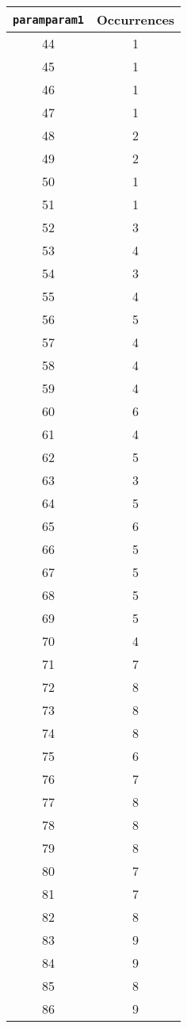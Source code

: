 \documentclass[letterpaper, 12pt]{article}
\begin{document}
\begin{longtable}{|c|c|}
\hline
\textbf{\texttt{paramparam1}} & \textbf{Occurrences} \\
\hline
44 & 1 \\
\hline
45 & 1 \\
\hline
46 & 1 \\
\hline
47 & 1 \\
\hline
48 & 2 \\
\hline
49 & 2 \\
\hline
50 & 1 \\
\hline
51 & 1 \\
\hline
52 & 3 \\
\hline
53 & 4 \\
\hline
54 & 3 \\
\hline
55 & 4 \\
\hline
56 & 5 \\
\hline
57 & 4 \\
\hline
58 & 4 \\
\hline
59 & 4 \\
\hline
60 & 6 \\
\hline
61 & 4 \\
\hline
62 & 5 \\
\hline
63 & 3 \\
\hline
64 & 5 \\
\hline
65 & 6 \\
\hline
66 & 5 \\
\hline
67 & 5 \\
\hline
68 & 5 \\
\hline
69 & 5 \\
\hline
70 & 4 \\
\hline
71 & 7 \\
\hline
72 & 8 \\
\hline
73 & 8 \\
\hline
74 & 8 \\
\hline
75 & 6 \\
\hline
76 & 7 \\
\hline
77 & 8 \\
\hline
78 & 8 \\
\hline
79 & 8 \\
\hline
80 & 7 \\
\hline
81 & 7 \\
\hline
82 & 8 \\
\hline
83 & 9 \\
\hline
84 & 9 \\
\hline
85 & 8 \\
\hline
86 & 9 \\

\end{longtable}
\end{document}
